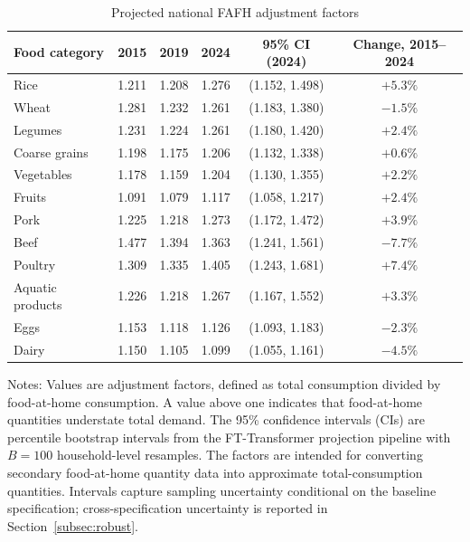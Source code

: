 \documentclass[preprint,12pt,authoryear]{elsarticle}
\begin{document}
\begin{table}[htbp]
\centering
\caption{Projected national FAFH adjustment factors}
\label{tab:national}
\begin{threeparttable}
\small
\setlength{\tabcolsep}{0pt}
\begin{tabular*}{\textwidth}{@{\extracolsep{\fill}} l c c c c c @{}}
\toprule
Food category & 2015 & 2019 & 2024 & 95\% CI (2024) & Change, 2015--2024 \\
\midrule
Rice & 1.211 & 1.208 & 1.276 & (1.152, 1.498) & $+5.3\%$ \\
Wheat & 1.281 & 1.232 & 1.261 & (1.183, 1.380) & $-1.5\%$ \\
Legumes & 1.231 & 1.224 & 1.261 & (1.180, 1.420) & $+2.4\%$ \\
Coarse grains & 1.198 & 1.175 & 1.206 & (1.132, 1.338) & $+0.6\%$ \\
Vegetables & 1.178 & 1.159 & 1.204 & (1.130, 1.355) & $+2.2\%$ \\
Fruits & 1.091 & 1.079 & 1.117 & (1.058, 1.217) & $+2.4\%$ \\
Pork & 1.225 & 1.218 & 1.273 & (1.172, 1.472) & $+3.9\%$ \\
Beef & 1.477 & 1.394 & 1.363 & (1.241, 1.561) & $-7.7\%$ \\
Poultry & 1.309 & 1.335 & 1.405 & (1.243, 1.681) & $+7.4\%$ \\
Aquatic products & 1.226 & 1.218 & 1.267 & (1.167, 1.552) & $+3.3\%$ \\
Eggs & 1.153 & 1.118 & 1.126 & (1.093, 1.183) & $-2.3\%$ \\
Dairy & 1.150 & 1.105 & 1.099 & (1.055, 1.161) & $-4.5\%$ \\
\bottomrule
\end{tabular*}
\begin{tablenotes}[flushleft]
\scriptsize
\item Notes: Values are adjustment factors, defined as total consumption divided by food-at-home consumption. A value above one indicates that food-at-home quantities understate total demand. The 95\% confidence intervals (CIs) are percentile bootstrap intervals from the FT-Transformer projection pipeline with $B=100$ household-level resamples. The factors are intended for converting secondary food-at-home quantity data into approximate total-consumption quantities. Intervals capture sampling uncertainty conditional on the baseline specification; cross-specification uncertainty is reported in Section~\ref{subsec:robust}.
\end{tablenotes}
\end{threeparttable}
\end{table}
\end{document}
